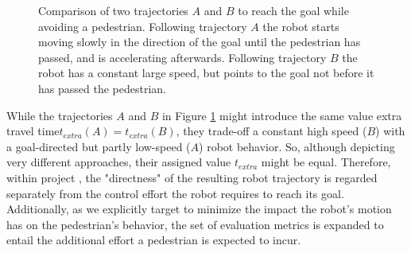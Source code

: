\begin{figure}[!ht]
\begin{center}
\end{center}
\caption{Comparison of two trajectories $A$ and $B$ to reach the goal while avoiding a pedestrian. Following trajectory $A$ the robot starts moving slowly in the direction of the goal until the pedestrian has passed, and is accelerating afterwards. Following trajectory $B$ the robot has a constant large speed, but points to the goal not before it has passed the pedestrian.}
\label{img:extra_time}
\end{figure}

While the trajectories $A$ and $B$ in Figure \ref{img:extra_time} might introduce the same value extra travel time$t_{extra}(A) = t_{extra}(B)$, they trade-off a constant high speed ($B$) with a goal-directed but partly low-speed ($A$) robot behavior. So, although depicting very different approaches, their assigned value  $t_{extra}$ might be equal. Therefore, within project \project, the "directness" of the resulting robot trajectory is regarded separately from the control effort the robot requires to reach its goal. Additionally, as we explicitly target to minimize the impact the robot's motion has on the pedestrian's behavior, the set of evaluation metrics is expanded to entail the additional effort a pedestrian is expected to incur.

